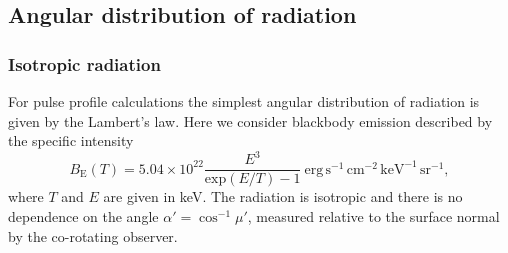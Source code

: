 \documentclass[iop, usenatbib]{emulateapj}
\newcommand{\be}{\begin{equation}}
\newcommand{\ee}{\end{equation}}
\newcommand{\sch}{Schwarzschild }
\newcommand{\rb}{\ensuremath{\bar{r}}}
\newcommand{\nub}{\ensuremath{\bar{\nu}}}
\newcommand{\zetab}{\ensuremath{\bar{\zeta}}}
\newcommand{\Bb}{\ensuremath{\bar{B}}}
\begin{document}

\subsection{Angular distribution of radiation}\label{sect:angular_distr}
\subsubsection{Isotropic radiation}

For pulse profile calculations the simplest angular distribution of radiation is given by the Lambert's law.
Here we consider blackbody emission described by the specific intensity
\begin{equation}
  B_{\mathrm{E}}(T) = 5.04 \times 10^{22} \frac{E^3}{\mathrm{exp}(E/T) -1}~\mathrm{erg}\,\mathrm{s}^{-1}\,\mathrm{cm}^{-2}\,\mathrm{keV}^{-1}\,\mathrm{sr}^{-1},
\end{equation}
where $T$ and $E$ are given in keV.
The radiation is isotropic and there is no dependence on the angle $\alpha'=\cos^{-1}\mu'$, measured relative to the surface normal by the co-rotating observer.
\end{document}
